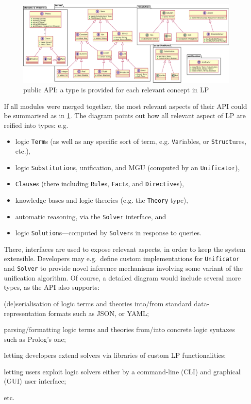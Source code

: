\documentclass[12pt,a4paper,openright,twoside]{book}
\begin{document}
\begin{figure}
    \centering
    \includegraphics[width=\linewidth]{figures/2p-kt-api.pdf}
    \caption{\twopkt{} public API: a type is provided for each relevant concept in LP}
    \label{fig:2p-kt-api}
\end{figure}

If all \twopkt{} modules were merged together, the most relevant aspects of their API could be summarised as in \cref{fig:2p-kt-api}.
%
The diagram points out how all relevant aspect of LP are reified into types: e.g.
%
\begin{itemize}
    \item logic \texttt{Term}s (as well as any specific sort of term, e.g. \texttt{Var}iables, or \texttt{Struct}ures, etc.),
    \item logic \texttt{Substitution}s, unification, and MGU (computed by an \texttt{Unificator}),
    \item \texttt{Clause}s (there including \texttt{Rule}s, \texttt{Fact}s, and \texttt{Directive}s),
    \item knowledge bases and logic theories (e.g. the \texttt{Theory} type),
    \item automatic reasoning, via the \texttt{Solver} interface, and
    \item logic \texttt{Solution}s---computed by \texttt{Solver}s in response to queries.
\end{itemize}
%
There, interfaces are used to expose relevant aspects, in order to keep the system extensible.
%
Developers may e.g.\ define custom implementations for \texttt{Unificator} and \texttt{Solver} to provide novel inference mechanisms involving some variant of the unification algorithm.
%
Of course, a detailed diagram would include several more types, as the \twopkt{} API also supports:
%
\begin{inlinelist}
    \item (de)se\-ria\-li\-sa\-tion of logic terms and theories into/from standard data-representation formats such as JSON, or YAML;
    \item parsing/formatting logic terms and theories from/into concrete logic syntaxes such as Prolog's one;
    \item letting developers extend solvers via libraries of custom LP functionalities;
    \item letting users exploit logic solvers either by a command-line (CLI) and graphical (GUI) user interface;
\end{inlinelist}
%
etc.
\end{document}
